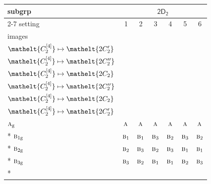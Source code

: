\documentclass[10pt,a4paper]{article}
\numberwithin{equation}{section}
\newcommand{\eltfont}[1]{{\let\sigma\eltsigma\mathelt{#1}}}
\newcommand{\grp}[1]{\mathsf{#1}}
\newcommand{\irr}[1]{\text{\normalfont\scshape #1}}
\newcommand{\cls}[1]{\eltfont{#1}}
\newcommand{\ptag}[1]{\mathrm{#1}}
\newcommand{\genidx}[2]{#1^{[\mathrm{#2}]}}
\begin{document}
{\small\begin{longtable}{@{}lcccccc@{}}\toprule
subgrp & \multicolumn{6}{c}{\href{2D2.pdf}{$\grp{2D_{2}}$}}\\\cmidrule(lr){2-7}
setting & 1 & 2 & 3 & 4 & 5 & 6\\
images & {\scriptsize\begin{tabular}[t]{@{}c@{}}$\cls{\genidx{C_{2}}{2}} \mapsto \cls{2C_{2}}$\\$\cls{\genidx{C_{2}}{4}} \mapsto \cls{2C_{2}'}$\end{tabular}} & {\scriptsize\begin{tabular}[t]{@{}c@{}}$\cls{\genidx{C_{2}}{2}} \mapsto \cls{2C_{2}}$\\$\cls{\genidx{C_{2}}{4}} \mapsto \cls{2C_{2}''}$\end{tabular}} & {\scriptsize\begin{tabular}[t]{@{}c@{}}$\cls{\genidx{C_{2}}{2}} \mapsto \cls{2C_{2}'}$\\$\cls{\genidx{C_{2}}{4}} \mapsto \cls{2C_{2}}$\end{tabular}} & {\scriptsize\begin{tabular}[t]{@{}c@{}}$\cls{\genidx{C_{2}}{2}} \mapsto \cls{2C_{2}'}$\\$\cls{\genidx{C_{2}}{4}} \mapsto \cls{2C_{2}''}$\end{tabular}} & {\scriptsize\begin{tabular}[t]{@{}c@{}}$\cls{\genidx{C_{2}}{2}} \mapsto \cls{2C_{2}''}$\\$\cls{\genidx{C_{2}}{4}} \mapsto \cls{2C_{2}}$\end{tabular}} & {\scriptsize\begin{tabular}[t]{@{}c@{}}$\cls{\genidx{C_{2}}{2}} \mapsto \cls{2C_{2}''}$\\$\cls{\genidx{C_{2}}{4}} \mapsto \cls{2C_{2}'}$\end{tabular}}\\\midrule\endhead
\bottomrule\endfoot\endlastfoot
$\irr{a}_{\ptag{g}}$ & $\irr{a}$ & $\irr{a}$ & $\irr{a}$ & $\irr{a}$ & $\irr{a}$ & $\irr{a}$\\*
$\irr{b}_{1\ptag{g}}$ & $\irr{b}_{1}$ & $\irr{b}_{1}$ & $\irr{b}_{3}$ & $\irr{b}_{2}$ & $\irr{b}_{3}$ & $\irr{b}_{2}$\\*
$\irr{b}_{2\ptag{g}}$ & $\irr{b}_{2}$ & $\irr{b}_{3}$ & $\irr{b}_{2}$ & $\irr{b}_{3}$ & $\irr{b}_{1}$ & $\irr{b}_{1}$\\*
$\irr{b}_{3\ptag{g}}$ & $\irr{b}_{3}$ & $\irr{b}_{2}$ & $\irr{b}_{1}$ & $\irr{b}_{1}$ & $\irr{b}_{2}$ & $\irr{b}_{3}$\\*

\end{longtable}}
\end{document}
